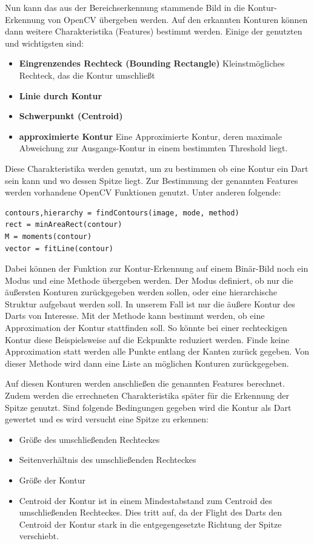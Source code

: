 Nun kann das aus der Bereichserkennung stammende Bild in die Kontur-Erkennung von OpenCV übergeben werden. Auf den erkannten Konturen können dann weitere Charakteristika (Features) bestimmt werden. Einige der genutzten und wichtigsten sind:
\begin{itemize}
	\item \textbf{Eingrenzendes Rechteck (Bounding Rectangle)} Kleinstmögliches Rechteck, das die Kontur umschließt
	\item \textbf{Linie durch Kontur}
	\item \textbf{Schwerpunkt (Centroid)} 
	\item \textbf{approximierte Kontur} Eine Approximierte Kontur, deren maximale Abweichung zur Ausgangs-Kontur in einem bestimmten Threshold liegt.
\end{itemize}
Diese Charakteristika werden genutzt, um zu bestimmen ob eine Kontur ein Dart sein kann und wo dessen Spitze liegt. Zur Bestimmung der genannten Features werden vorhandene OpenCV Funktionen genutzt. Unter anderen folgende:
\begin{lstlisting}[frame=single]
contours,hierarchy = findContours(image, mode, method)
rect = minAreaRect(contour)
M = moments(contour)
vector = fitLine(contour)
\end{lstlisting}
Dabei können der Funktion zur Kontur-Erkennung auf einem Binär-Bild noch ein Modus und eine Methode übergeben werden. Der Modus definiert, ob nur die äußersten Konturen zurückgegeben werden sollen, oder eine hierarchische Struktur aufgebaut werden soll. In unserem Fall ist nur die äußere Kontur des Darts von Interesse. Mit der Methode kann bestimmt werden, ob eine Approximation der Kontur stattfinden soll. So könnte bei einer rechteckigen Kontur diese Beispielsweise auf die Eckpunkte reduziert werden. Finde keine Approximation statt werden alle Punkte entlang der Kanten zurück gegeben. Von dieser Methode wird dann eine Liste an möglichen Konturen zurückgegeben. 

Auf diesen Konturen werden anschließen die genannten Features berechnet.
Zudem werden die errechneten Charakteristika später für die Erkennung der Spitze genutzt.
Sind folgende Bedingungen gegeben wird die Kontur als Dart gewertet und es wird versucht eine Spitze zu erkennen:
\begin{itemize}
	\item Größe des umschließenden Rechteckes
	\item Seitenverhältnis des umschließenden Rechteckes
	\item Größe der Kontur
	\item Centroid der Kontur ist in einem Mindestabstand zum Centroid des umschließenden Rechteckes. Dies tritt auf, da der Flight des Darts den Centroid der Kontur stark in die entgegengesetzte Richtung der Spitze verschiebt. 
\end{itemize}

